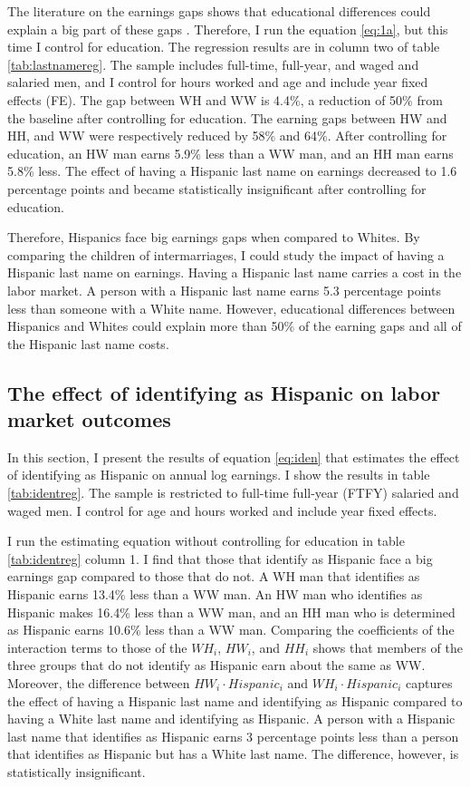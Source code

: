 \documentclass[12pt, fullpage]{article}
\begin{document}
The literature on the earnings gaps shows that educational differences could explain a big part of these gaps \citep{duncan2006hispanics, duncan2017complexity, duncan2018identifying, duncan2020new}. Therefore, I run the equation \ref{eq:1a}, but this time I control for education. The regression results are in column two of table \ref{tab:lastnamereg}. The sample includes full-time, full-year, and waged and salaried men, and I control for hours worked and age and include year fixed effects (FE). The gap between WH and WW is 4.4\%, a reduction of 50\% from the baseline after controlling for education. The earning gaps between HW and HH, and WW were respectively reduced by 58\% and 64\%. After controlling for education, an HW man earns 5.9\% less than a WW man, and an HH man earns 5.8\% less. The effect of having a Hispanic last name on earnings decreased to 1.6 percentage points and became statistically insignificant after controlling for education.

Therefore, Hispanics face big earnings gaps when compared to Whites. By comparing the children of intermarriages, I could study the impact of having a Hispanic last name on earnings. Having a Hispanic last name carries a cost in the labor market. A person with a Hispanic last name earns 5.3 percentage points less than someone with a White name. However, educational differences between Hispanics and Whites could explain more than 50\% of the earning gaps and all of the Hispanic last name costs.

\subsection{The effect of identifying as Hispanic on labor market outcomes}

In this section, I present the results of equation \ref{eq:iden} that estimates the effect of identifying as Hispanic on annual log earnings. I show the results in table \ref{tab:identreg}. The sample is restricted to full-time full-year (FTFY) salaried and waged men. I control for age and hours worked and include year fixed effects.

I run the estimating equation without controlling for education in table \ref{tab:identreg} column 1. I find that those that identify as Hispanic face a big earnings gap compared to those that do not. A WH man that identifies as Hispanic earns 13.4\% less than a WW man. An HW man who identifies as Hispanic makes 16.4\% less than a WW man, and an HH man who is determined as Hispanic earns 10.6\% less than a WW man. Comparing the coefficients of the interaction terms to those of the $WH_{i}$, $HW_{i}$, and $HH_{i}$ shows that members of the three groups that do not identify as Hispanic earn about the same as WW.
Moreover, the difference between $HW_{i} \cdot Hispanic_{i}$  and $WH_{i} \cdot Hispanic_{i}$ captures the effect of having a Hispanic last name and identifying as Hispanic compared to having a White last name and identifying as Hispanic. A person with a Hispanic last name that identifies as Hispanic earns 3 percentage points less than a person that identifies as Hispanic but has a White last name. The difference, however, is statistically insignificant.
\end{document}
